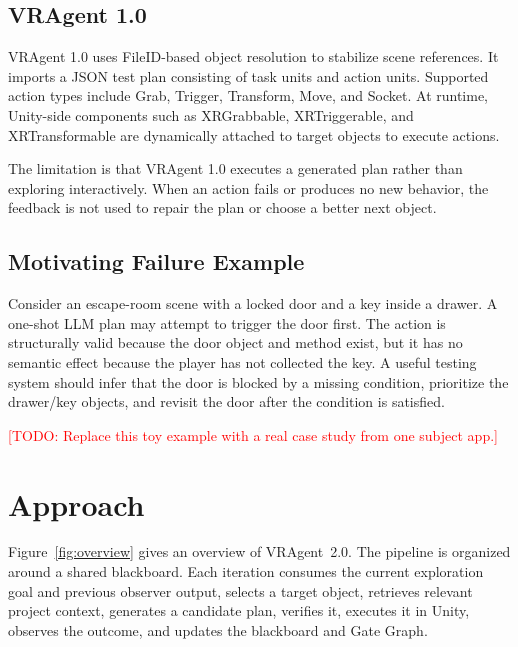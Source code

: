 \documentclass[10pt,conference]{IEEEtran}
\newcommand{\todo}[1]{\textcolor{red}{[TODO: #1]}}
\newcommand{\tool}{VRAgent~2.0}
\begin{document}
\subsection{VRAgent 1.0}

VRAgent 1.0 uses FileID-based object resolution to stabilize scene references.
It imports a JSON test plan consisting of task units and action units. Supported
action types include Grab, Trigger, Transform, Move, and Socket. At runtime,
Unity-side components such as XRGrabbable, XRTriggerable, and XRTransformable are
dynamically attached to target objects to execute actions.

The limitation is that VRAgent 1.0 executes a generated plan rather than
exploring interactively. When an action fails or produces no new behavior, the
feedback is not used to repair the plan or choose a better next object.

\subsection{Motivating Failure Example}

Consider an escape-room scene with a locked door and a key inside a drawer. A
one-shot LLM plan may attempt to trigger the door first. The action is
structurally valid because the door object and method exist, but it has no
semantic effect because the player has not collected the key. A useful testing
system should infer that the door is blocked by a missing condition, prioritize
the drawer/key objects, and revisit the door after the condition is satisfied.

\todo{Replace this toy example with a real case study from one subject app.}

\section{Approach}

Figure~\ref{fig:overview} gives an overview of \tool. The pipeline is organized
around a shared blackboard. Each iteration consumes the current exploration goal
and previous observer output, selects a target object, retrieves relevant project
context, generates a candidate plan, verifies it, executes it in Unity, observes
the outcome, and updates the blackboard and Gate Graph.
\end{document}
